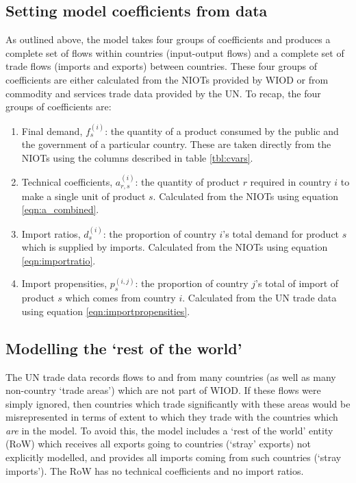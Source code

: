 \documentclass[a4paper]{article}
\begin{document}
\subsection{Setting model coefficients from data}
As outlined above, the model takes four groups of coefficients and produces a complete set of flows within countries (input-output flows) and a complete set of trade flows (imports and exports) between countries. These four groups of coefficients are either calculated from the NIOTs provided by WIOD or from commodity and services trade data provided by the UN.
To recap, the four groups of coefficients are:
\begin{enumerate}
\item Final demand, $f_s^{(i)}$: the quantity of a product consumed by the public and the government of a particular country. These are taken directly from the NIOTs using the columns described in table \ref{tbl:cvars}.
\item Technical coefficients, $a_{r,s}^{(i)}$: the quantity of product $r$ required in country $i$ to make a single unit of product $s$. Calculated from the NIOTs using equation \eqref{eqn:a_combined}. 
\item Import ratios, $d_s^{(i)}$: the proportion of country $i$'s total demand for product $s$ which is supplied by imports. Calculated from the NIOTs using equation \eqref{eqn:importratio}.
\item Import propensities, $p_s^{(i,j)}$: the proportion of country $j$'s total of import of product $s$ which comes from country $i$. Calculated from the UN trade data using equation \eqref{eqn:importpropensities}.
\end{enumerate}

\subsection{Modelling the `rest of the world'}\label{sec:RoW}
The UN trade data records flows to and from many countries (as well as many non-country `trade areas') which are not part of WIOD. If these flows were simply ignored, then countries which trade significantly with these areas would be misrepresented in terms of extent to which they trade with the countries which \textit{are} in the model. To avoid this, the model includes a `rest of the world' entity (RoW) which receives all exports going to countries (`stray' exports) not explicitly modelled, and provides all imports coming from such countries (`stray imports'). The RoW has no technical coefficients and no import ratios.
\end{document}
